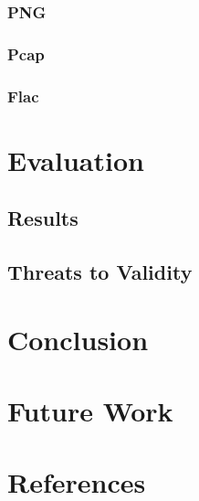 \documentclass[a4paper]{scrartcl}
\begin{document}
\subsubsection{PNG}
\subsubsection{Pcap}
\subsubsection{Flac}
\section{Evaluation}
\subsection{Results}
\subsection{Threats to Validity}
\section{Conclusion}
\section{Future Work}

\newpage
\section*{References}
\renewcommand\refname{}


\end{document}
